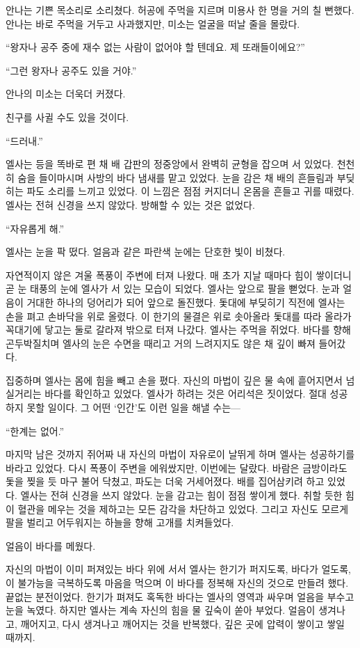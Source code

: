 안나는 기쁜 목소리로 소리쳤다. 허공에 주먹을 지르며 미용사 한 명을 거의 칠 뻔했다. 안나는 바로 주먹을 거두고 사과했지만, 미소는 얼굴을 떠날 줄을 몰랐다.

``왕자나 공주 중에 재수 없는 사람이 없어야 할 텐데요. 제 또래들이에요?''

``그런 왕자나 공주도 있을 거야.''

안나의 미소는 더욱더 커졌다.

친구를 사귈 수도 있을 것이다.

\textbreak

``드러내.''

엘사는 등을 똑바로 편 채 배 갑판의 정중앙에서 완벽히 균형을 잡으며 서 있었다. 천천히 숨을 들이마시며 사방의 바다 냄새를 맡고 있었다. 눈을 감은 채 배의 흔들림과 부딪히는 파도 소리를 느끼고 있었다. 이 느낌은 점점 커지더니 온몸을 흔들고 귀를 때렸다. 엘사는 전혀 신경을 쓰지 않았다. 방해할 수 있는 것은 없었다.

``자유롭게 해.''

엘사는 눈을 팍 떴다. 얼음과 같은 파란색 눈에는 단호한 빛이 비쳤다.

자연적이지 않은 겨울 폭풍이 주변에 터져 나왔다. 매 초가 지날 때마다 힘이 쌓이더니 곧 눈 태풍의 눈에 엘사가 서 있는 모습이 되었다. 엘사는 앞으로 팔을 뻗었다. 눈과 얼음이 거대한 하나의 덩어리가 되어 앞으로 돌진했다. 돛대에 부딪히기 직전에 엘사는 손을 펴고 손바닥을 위로 올렸다. 이 한기의 물결은 위로 솟아올라 돛대를 따라 올라가 꼭대기에 닿고는 둘로 갈라져 밖으로 터져 나갔다. 엘사는 주먹을 쥐었다. 바다를 향해 곤두박질치며 엘사의 눈은 수면을 때리고 거의 느려지지도 않은 채 깊이 빠져 들어갔다.

집중하며 엘사는 몸에 힘을 빼고 손을 폈다. 자신의 마법이 깊은 물 속에 흩어지면서 넘실거리는 바다를 확인하고 있었다. 엘사가 하려는 것은 어리석은 짓이었다. 절대 성공하지 못할 일이다. 그 어떤 `인간'도 이런 일을 해낼 수는—

``한계는 없어.''

마지막 남은 것까지 쥐어짜 내 자신의 마법이 자유로이 날뛰게 하며 엘사는 성공하기를 바라고 있었다. 다시 폭풍이 주변을 에워쌌지만, 이번에는 달랐다. 바람은 금방이라도 돛을 찢을 듯 마구 불어 닥쳤고, 파도는 더욱 거세어졌다. 배를 집어삼키려 하고 있었다. 엘사는 전혀 신경을 쓰지 않았다. 눈을 감고는 힘이 점점 쌓이게 했다. 취할 듯한 힘이 혈관을 메우는 것을 제하고는 모든 감각을 차단하고 있었다. 그리고 자신도 모르게 팔을 벌리고 어두워지는 하늘을 향해 고개를 치켜들었다.

얼음이 바다를 메웠다.

자신의 마법이 이미 퍼져있는 바다 위에 서서 엘사는 한기가 퍼지도록, 바다가 얼도록, 이 불가능을 극복하도록 마음을 먹으며 이 바다를 정복해 자신의 것으로 만들려 했다. 끝없는 분전이었다. 한기가 펴져도 혹독한 바다는 엘사의 영역과 싸우며 얼음을 부수고 눈을 녹였다. 하지만 엘사는 계속 자신의 힘을 물 깊숙이 쏟아 부었다. 얼음이 생겨나고, 깨어지고, 다시 생겨나고 깨어지는 것을 반복했다, 깊은 곳에 압력이 쌓이고 쌓일 때까지.

